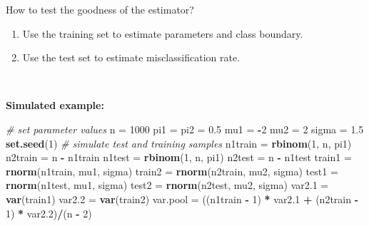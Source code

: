 \documentclass[
  10pt,
  ignorenonframetext,
]{beamer}
\newenvironment{Shaded}{\begin{snugshade}}{\end{snugshade}}
\newcommand{\CommentTok}[1]{\textcolor[rgb]{0.56,0.35,0.01}{\textit{#1}}}
\newcommand{\DecValTok}[1]{\textcolor[rgb]{0.00,0.00,0.81}{#1}}
\newcommand{\FloatTok}[1]{\textcolor[rgb]{0.00,0.00,0.81}{#1}}
\newcommand{\FunctionTok}[1]{\textcolor[rgb]{0.13,0.29,0.53}{\textbf{#1}}}
\newcommand{\NormalTok}[1]{#1}
\newcommand{\OtherTok}[1]{\textcolor[rgb]{0.56,0.35,0.01}{#1}}
\newcommand{\SpecialCharTok}[1]{\textcolor[rgb]{0.81,0.36,0.00}{\textbf{#1}}}
\providecommand{\tightlist}{%
  \setlength{\itemsep}{0pt}\setlength{\parskip}{0pt}}
\begin{document}
\begin{frame}[fragile]
\begin{block}{How to test the goodness of the estimator?}
\protect\hypertarget{how-to-test-the-goodness-of-the-estimator}{}
\(~\)

\begin{enumerate}
\tightlist
\item
  Use the training set to estimate parameters and class boundary.
\item
  Use the test set to estimate misclassification rate.
\end{enumerate}

\(~\)

\textbf{Simulated example:}

\vspace{1mm}

\scriptsize

\begin{Shaded}
\begin{Highlighting}[]
\CommentTok{\# set parameter values}
\NormalTok{n }\OtherTok{=} \DecValTok{1000}
\NormalTok{pi1 }\OtherTok{=}\NormalTok{ pi2 }\OtherTok{=} \FloatTok{0.5}
\NormalTok{mu1 }\OtherTok{=} \SpecialCharTok{{-}}\DecValTok{2}
\NormalTok{mu2 }\OtherTok{=} \DecValTok{2}
\NormalTok{sigma }\OtherTok{=} \FloatTok{1.5}
\FunctionTok{set.seed}\NormalTok{(}\DecValTok{1}\NormalTok{)}
\CommentTok{\# simulate test and training samples}
\NormalTok{n1train }\OtherTok{=} \FunctionTok{rbinom}\NormalTok{(}\DecValTok{1}\NormalTok{, n, pi1)}
\NormalTok{n2train }\OtherTok{=}\NormalTok{ n }\SpecialCharTok{{-}}\NormalTok{ n1train}
\NormalTok{n1test }\OtherTok{=} \FunctionTok{rbinom}\NormalTok{(}\DecValTok{1}\NormalTok{, n, pi1)}
\NormalTok{n2test }\OtherTok{=}\NormalTok{ n }\SpecialCharTok{{-}}\NormalTok{ n1test}
\NormalTok{train1 }\OtherTok{=} \FunctionTok{rnorm}\NormalTok{(n1train, mu1, sigma)}
\NormalTok{train2 }\OtherTok{=} \FunctionTok{rnorm}\NormalTok{(n2train, mu2, sigma)}
\NormalTok{test1 }\OtherTok{=} \FunctionTok{rnorm}\NormalTok{(n1test, mu1, sigma)}
\NormalTok{test2 }\OtherTok{=} \FunctionTok{rnorm}\NormalTok{(n2test, mu2, sigma)}
\NormalTok{var2}\FloatTok{.1} \OtherTok{=} \FunctionTok{var}\NormalTok{(train1)}
\NormalTok{var2}\FloatTok{.2} \OtherTok{=} \FunctionTok{var}\NormalTok{(train2)}
\NormalTok{var.pool }\OtherTok{=}\NormalTok{ ((n1train }\SpecialCharTok{{-}} \DecValTok{1}\NormalTok{) }\SpecialCharTok{*}\NormalTok{ var2}\FloatTok{.1} \SpecialCharTok{+}\NormalTok{ (n2train }\SpecialCharTok{{-}} \DecValTok{1}\NormalTok{) }\SpecialCharTok{*}\NormalTok{ var2}\FloatTok{.2}\NormalTok{)}\SpecialCharTok{/}\NormalTok{(n }\SpecialCharTok{{-}} \DecValTok{2}\NormalTok{)}
\end{Highlighting}
\end{Shaded}
\end{block}
\end{frame}
\end{document}
